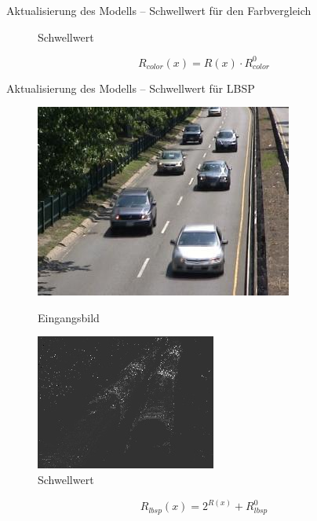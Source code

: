 \documentclass[hyperref={pdfpagelabels=false}]{beamer}
\begin{document}
\begin{frame}[t]{Aktualisierung des Modells -- Schwellwert für den Farbvergleich}
\begin{figure}
\begin{minipage}{0.45\linewidth}
			\caption*{Schwellwert}
		\end{minipage}
	\end{figure}
	\bigskip
	\begin{equation*}
		R_{color}(x) = R(x) \cdot R^0_{color} 	
	\end{equation*}
\end{frame}

\begin{frame}[t]{Aktualisierung des Modells -- Schwellwert für LBSP}
	\vspace{1.65em}
	\begin{figure}
		\centering
		\begin{minipage}{0.45\linewidth}
			\includegraphics[width=1\linewidth]{Abbildungen/Eingang3.jpg}
			\caption*{Eingangsbild}
		\end{minipage}
		\begin{minipage}{0.45\linewidth}
			\includegraphics[width=1\linewidth]{Abbildungen/R_lbsp.jpg}
			\caption*{Schwellwert}
		\end{minipage}
	\end{figure}
	\bigskip
	\begin{equation*}
		R_{lbsp}(x) = 2^{R(x)} + R^0_{lbsp} 	
	\end{equation*}
\end{frame}
\end{document}
